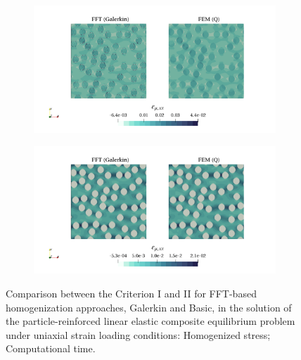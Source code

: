 \begin{figure}[hbt]
\centering
	\begin{subfigure}[b]{\textwidth}
    \centering
    \includegraphics[width=\textwidth]{figures/linear_2D_ratio_-4_normal_strain_11}
    \caption{}
    \label{subfig:linear_2D_ratio_4_normal_strain_11}
  \end{subfigure}
  \begin{subfigure}[b]{\textwidth}
    \centering
    \includegraphics[width=\textwidth]{figures/linear_2D_ratio_4_normal_strain_11}
    \caption{}
    \label{subfig:linear_2D_ratio_-4_normal_strain_11}
  \end{subfigure}
\caption{Comparison between the Criterion I and II for FFT-based homogenization approaches, Galerkin and Basic, in the
solution of the particle-reinforced linear elastic composite equilibrium problem under uniaxial
strain loading conditions:  Homogenized stress;  Computational time.}
\label{fig:linear_3D_normal_comparison_crit}
\end{figure}

